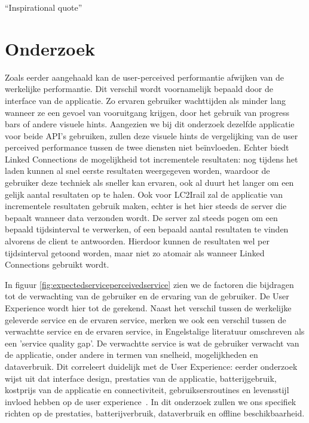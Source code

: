 \begin{savequote}[0.55\linewidth]
	``Inspirational quote''
\end{savequote}

\chapter{Onderzoek}

\label{chap:onderzoek}
Zoals eerder aangehaald kan de user-perceived performantie afwijken van de werkelijke performantie. Dit verschil wordt voornamelijk bepaald door de interface van de applicatie. Zo ervaren gebruiker wachttijden als minder lang wanneer ze een gevoel van vooruitgang krijgen, door het gebruik van progress bars of andere visuele hints. Aangezien we bij dit onderzoek dezelfde applicatie voor beide API's gebruiken, zullen deze visuele hints de vergelijking van de user perceived performance tussen de twee diensten niet beïnvloeden. Echter biedt Linked Connections de mogelijkheid tot incrementele resultaten: nog tijdens het laden kunnen al snel eerste resultaten weergegeven worden, waardoor de gebruiker deze techniek als sneller kan ervaren, ook al duurt het langer om een gelijk aantal resultaten op te halen. Ook voor LC2Irail zal de applicatie van incrementele resultaten gebruik maken, echter is het hier steeds de server die bepaalt wanneer data verzonden wordt. De server zal steeds pogen om een bepaald tijdsinterval te verwerken, of een bepaald aantal resultaten te vinden alvorens de client te antwoorden. Hierdoor kunnen de resultaten wel per tijdsinterval getoond worden, maar niet zo atomair als wanneer Linked Connections gebruikt wordt.

In figuur \ref{fig:expectedserviceperceivedservice} zien we de factoren die bijdragen tot de verwachting van de gebruiker en de ervaring van de gebruiker. De User Experience wordt hier tot de  gerekend. Naast het verschil tussen de werkelijke geleverde service en de ervaren service, merken we ook een verschil tussen de verwachtte service en de ervaren service, in Engelstalige literatuur omschreven als een 'service quality gap'. De verwachtte service is wat de gebruiker verwacht van de applicatie, onder andere in termen van snelheid, mogelijkheden en dataverbruik. Dit correleert duidelijk met de User Experience: eerder onderzoek wijst uit dat interface design, prestaties van de applicatie, batterijgebruik, kostprijs van de applicatie en connectiviteit, gebruiksersroutines en levensstijl invloed hebben op de user experience~\citep{ickin12}. In dit onderzoek zullen we ons specifiek richten op de prestaties, batterijverbruik, dataverbruik en  offline beschikbaarheid.

